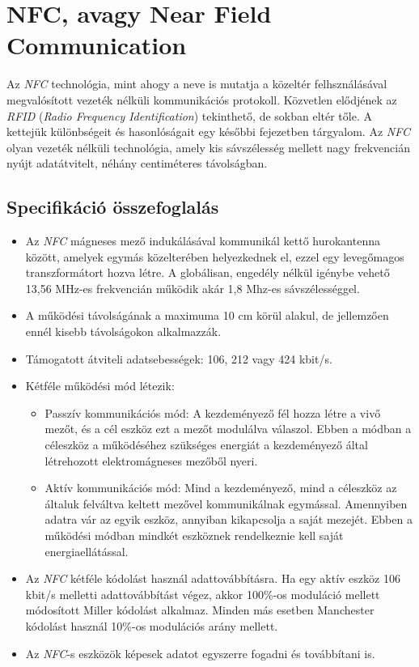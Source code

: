 \documentclass[12pt]{article}
\begin{document}
\section[NFC]{NFC, avagy Near Field Communication}
Az \emph{NFC} technológia, mint ahogy a neve is mutatja a közeltér felhsználásával
megvalósított vezeték nélküli kommunikációs protokoll. Közvetlen elődjének az
\emph{RFID} (\emph{Radio Frequency Identification}) tekinthető, de sokban eltér tőle. A 
kettejük különbségeit és hasonlóságait egy későbbi fejezetben tárgyalom.
Az \emph{NFC} olyan vezeték nélküli technológia, amely kis sávszélesség mellett
nagy frekvencián nyújt adatátvitelt, néhány centiméteres távolságban.

\subsection{Specifikáció összefoglalás}
\begin{itemize}
\item Az \emph{NFC} mágneses mező indukálásával kommunikál kettő hurokantenna között,
amelyek egymás közelterében  helyezkednek el, ezzel egy levegőmagos
transzformátort hozva létre. A globálisan, engedély nélkül igénybe vehető 
13,56 MHz-es frekvencián működik akár 1,8 Mhz-es sávszélességgel.
\item A működési távolságának a maximuma 10 cm körül alakul, de jellemzően ennél
kisebb távolságokon alkalmazzák.
\item Támogatott átviteli adatsebességek: 106, 212 vagy 424 kbit/s.
\item Kétféle működési mód létezik:
\begin{itemize}
\item Passzív kommunikációs mód: A kezdeményező fél hozza létre a vivő mezőt, és a
cél eszköz ezt a mezőt modulálva válaszol. Ebben a módban a céleszköz a 
működéséhez szükséges energiát a kezdeményező által létrehozott elektromágneses
mezőből nyeri.
\item Aktív kommunikációs mód: Mind a kezdeményező, mind a céleszköz az általuk
felváltva keltett mezővel kommunikálnak egymással. 
Amennyiben adatra vár az egyik eszköz,
annyiban kikapcsolja a saját mezejét. Ebben a működési módban mindkét eszköznek
rendelkeznie kell saját energiaellátással.
\end{itemize}
\item Az \emph{NFC} kétféle kódolást használ adattovábbításra. Ha egy aktív eszköz 
106 kbit/s melletti adattovábbítást végez, akkor 100\%-os moduláció mellett
módosított Miller kódolást alkalmaz. Minden más esetben Manchester kódolást
használ 10\%-os modulációs arány mellett.
\item Az \emph{NFC}-s eszközök képesek adatot egyszerre fogadni és továbbítani is. 
\end{itemize}
\end{document}
